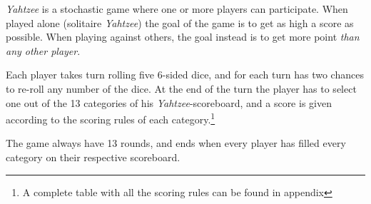 \emph{Yahtzee} is a stochastic game where one or more players can participate. 
When played alone (solitaire \emph{Yahtzee}) the goal of the game is to get as high a score as possible. 
When playing against others, the goal instead is to get more point \emph{than any other player}.

Each player takes turn rolling five 6-sided dice, and for each turn has two chances to re-roll any number of the dice. At the end of the turn the player has to select one out of the 13 categories of his \emph{Yahtzee}-scoreboard, and a score is given according to the scoring rules of each category.\footnote{A complete table with all the scoring rules can be found in appendix}%

The game always have 13 rounds, and ends when every player has filled every category on their respective scoreboard.
